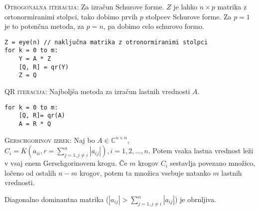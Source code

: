 \documentclass[a4paper,10pt]{article}
\theoremstyle{definition}
\def\C{\mathbb{C}}
\begin{document}
\textsc{Otrogonalna iteracija:} Za izračun Schurove forme. $Z$ je lahko $n\times
p$ matrika z ortonormiranimi stolpci, tako dobimo prvih $p$ stolpcev Schurove
forme. Za $p = 1$ je to potenčna metoda, za $p = n$, pa dobimo celo schurovo
formo.
\scriptsize
\begin{verbatim}
Z = eye(n) // naključna matrika z otronormiranimi stolpci
for k = 0 to m:
    Y = A * Z
    [Q, R] = qr(Y)
    Z = Q
\end{verbatim}
\normalsize

\textsc{QR iteracija:} Najboljša metoda za izračun lastnih vrednosti $A$.
\scriptsize
\begin{verbatim}
for k = 0 to m:
    [Q, R]= qr(A)
    A = R * Q
\end{verbatim}
\normalsize

\textsc{Gerschgorinov izrek:} Naj bo $A \in \C ^{n\times n}$, $C_i =
\overline{K}(a_{ii}, r=\sum_{j=1, j \neq i}^n | a_{ij}|), i=1,2,\ldots ,n$.
Potem vsaka lastna vrednost leži v vsaj enem Gerschgorinovem krogu. Če $m$
krogov $C_i$ sestavlja povezano množico, ločeno od ostalih $n-m$ krogov, potem
ta množica vsebuje natanko $m$ lastnih vrednosti.

Diagonalno dominantna matrika ($|a_{ij}| > \sum_{j=1, j\neq i}^n|a_{ij}|$) je obrnljiva.




%


\end{document}
